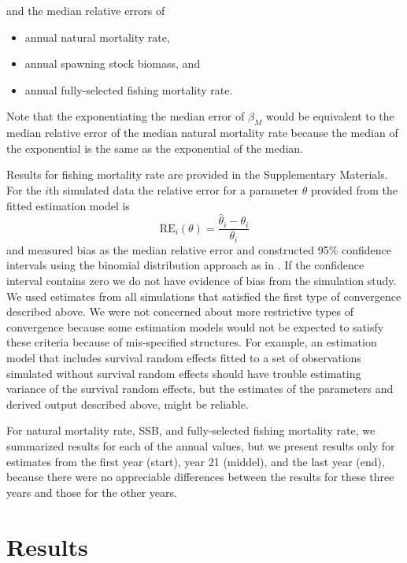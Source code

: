 \documentclass[
  12pt,
]{article}
\begin{document}
and the median relative errors of

\begin{itemize}
\item annual natural mortality rate,
\item annual spawning stock biomass, and
\item annual fully-selected fishing mortality rate.
\end{itemize}

Note that the exponentiating the median error of \(\beta_M\) would be equivalent to the median relative error of the median natural mortality rate because the median of the exponential is the same as the exponential of the median.

Results for fishing mortality rate are provided in the Supplementary Materials. For the \(i\)th simulated data the relative error for a parameter \(\theta\) provided from the fitted estimation model is
\[
{\text{RE}_i}\left(\theta\right) = \frac{\widehat \theta_i - \theta_i}{\theta_i}
\]
and measured bias as the median relative error and constructed 95\% confidence intervals using the binomial distribution approach as in \citet{stockmiller21}. If the confidence interval contains zero we do not have evidence of bias from the simulation study. We used estimates from all simulations that satisfied the first type of convergence described above. We were not concerned about more restrictive types of convergence because some estimation models would not be expected to satisfy these criteria because of mis-specified structures. For example, an estimation model that includes survival random effects fitted to a set of observations simulated without survival random effects should have trouble estimating variance of the survival random effects, but the estimates of the parameters and derived output described above, might be reliable.

For natural mortality rate, SSB, and fully-selected fishing mortality rate, we summarized results for each of the annual values, but we present results only for estimates from the first year (start), year 21 (middel), and the last year (end), because there were no appreciable differences between the results for these three years and those for the other years.

\hypertarget{results}{%
\section*{Results}\label{results}}
\end{document}
